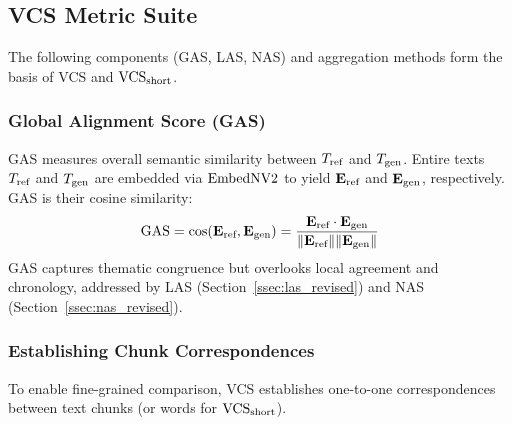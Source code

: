 \subsection{VCS Metric Suite} %
\label{sec:vcs_metric_suite_revised} %
The following components (GAS, LAS, NAS) and aggregation methods form the basis of VCS and $\text{VCS}_{\text{short}}$.
\subsubsection{Global Alignment Score (GAS)} %
\label{ssec:gas_revised} %
GAS measures overall semantic similarity between $T_{\text{ref}}$ and $T_{\text{gen}}$. Entire texts $T_{\text{ref}}$ and $T_{\text{gen}}$ are embedded via $\text{EmbedNV2}$\cite{lee2024nv} to yield $\mathbf{E}_{\text{ref}}$ and $\mathbf{E}_{\text{gen}}$, respectively. GAS is their cosine similarity:
\begin{equation} \label{eq:gas_revised}
\text{GAS} = \cos(\mathbf{E}_{\text{ref}}, \mathbf{E}_{\text{gen}}) = \frac{\mathbf{E}_{\text{ref}} \cdot \mathbf{E}_{\text{gen}}}{\|\mathbf{E}_{\text{ref}}\| \|\mathbf{E}_{\text{gen}}\|}
\end{equation}
GAS captures thematic congruence but overlooks local agreement and chronology, addressed by LAS (Section~\ref{ssec:las_revised}) and NAS (Section~\ref{ssec:nas_revised}).

\subsubsection{Establishing Chunk Correspondences} %
\label{ssec:chunk_correspondences_revised} %
To enable fine-grained comparison, VCS establishes one-to-one correspondences between text chunks (or words for $\text{VCS}_{\text{short}}$).

